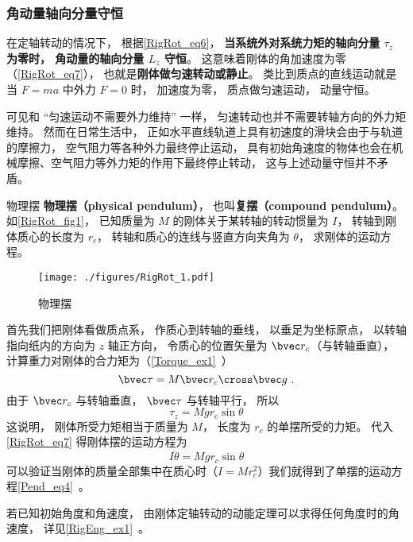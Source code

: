 \subsubsection{角动量轴向分量守恒}
在定轴转动的情况下， 根据\autoref{RigRot_eq6}， \textbf{当系统外对系统力矩的轴向分量 $\tau_z$ 为零时， 角动量的轴向分量 $L_z$ 守恒}。  这意味着刚体的角加速度为零（\autoref{RigRot_eq7}）， 也就是\textbf{刚体做匀速转动或静止}。 类比到质点的直线运动就是当 $F = ma$ 中外力 $F = 0$ 时， 加速度为零， 质点做匀速运动， 动量守恒。

可见和 “匀速运动不需要外力维持” 一样， 匀速转动也并不需要转轴方向的外力矩维持。 然而在日常生活中， 正如水平直线轨道上具有初速度的滑块会由于与轨道的摩擦力， 空气阻力等各种外力最终停止运动， 具有初始角速度的物体也会在机械摩擦、空气阻力等外力矩的作用下最终停止转动， 这与上述动量守恒并不矛盾。

\begin{example}{物理摆}\label{RigRot_ex1}
\textbf{物理摆（physical pendulum）}， 也叫\textbf{复摆（compound pendulum）}。 如\autoref{RigRot_fig1}， 已知质量为 $M$ 的刚体关于某转轴的转动惯量为 $I$， 转轴到刚体质心的长度为 $r_c$， 转轴和质心的连线与竖直方向夹角为 $\theta$， 求刚体的运动方程。
\begin{figure}[ht]
\centering
\texttt{[image: ./figures/RigRot\_1.pdf]}
\caption{物理摆} \label{RigRot_fig1}
\end{figure}

首先我们把刚体看做质点系， 作质心到转轴的垂线， 以垂足为坐标原点， 以转轴指向纸内的方向为 $z$ 轴正方向， 令质心的位置矢量为 $\bvec r_c$（与转轴垂直）， 计算重力对刚体的合力矩为（\autoref{Torque_ex1}~）
\begin{equation}\label{RigRot_eq14}
\bvec \tau = M \bvec r_c \cross \bvec g~.
\end{equation}
由于 $\bvec r_c$ 与转轴垂直， $\bvec \tau$ 与转轴平行， 所以
\begin{equation}
\tau_z = Mg r_c \sin\theta
\end{equation}
这说明， 刚体所受力矩相当于质量为 $M$， 长度为 $r_c$ 的单摆所受的力矩。 代入\autoref{RigRot_eq7} 得刚体摆的运动方程为
\begin{equation}
I\ddot \theta = Mg r_c \sin\theta
\end{equation}
可以验证当刚体的质量全部集中在质心时（$I = Mr_c^2$）我们就得到了单摆的运动方程\autoref{Pend_eq4}~。

若已知初始角度和角速度， 由刚体定轴转动的动能定理可以求得任何角度时的角速度， 详见\autoref{RigEng_ex1}~。
\end{example}

